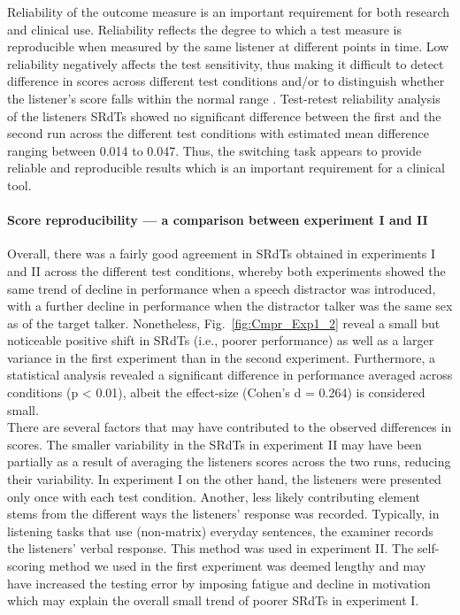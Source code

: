 \documentclass[a4paper, twoside]{templates/ociamthesis}
\begin{document}
\hfill\break
Reliability of the outcome measure is an important requirement for both research and clinical use. Reliability reflects the degree to which a test measure is reproducible when measured by the same listener at different points in time. Low reliability negatively affects the test sensitivity, thus making it difficult to detect difference in scores across different test conditions and/or to distinguish whether the listener's score falls within the normal range \autocite{Cameron2007}.
Test-retest reliability analysis of the listeners SRdTs showed no significant difference between the first and the second run across the different test conditions with estimated mean difference ranging between 0.014 to 0.047. Thus, the switching task appears to provide reliable and reproducible results which is an important requirement for a clinical tool.\\

\hypertarget{score-reproducibility-a-comparison-between-experiment-i-and-ii-1}{%
\paragraph{Score reproducibility --- a comparison between experiment I and II}\label{score-reproducibility-a-comparison-between-experiment-i-and-ii-1}}

\hfill\break
Overall, there was a fairly good agreement in SRdTs obtained in experiments I and II across the different test conditions, whereby both experiments showed the same trend of decline in performance when a speech distractor was introduced, with a further decline in performance when the distractor talker was the same sex as of the target talker. Nonetheless, Fig.~\ref{fig:Cmpr_Exp1_2} reveal a small but noticeable positive shift in SRdTs (i.e., poorer performance) as well as a larger variance in the first experiment than in the second experiment. Furthermore, a statistical analysis revealed a significant difference in performance averaged across conditions (p \textless{} 0.01), albeit the effect-size (Cohen's d = 0.264) is considered small.\\

There are several factors that may have contributed to the observed differences in scores. The smaller variability in the SRdTs in experiment II may have been partially as a result of averaging the listeners scores across the two runs, reducing their variability. In experiment I on the other hand, the listeners were presented only once with each test condition. Another, less likely contributing element stems from the different ways the listeners' response was recorded. Typically, in listening tasks that use (non-matrix) everyday sentences, the examiner records the listeners' verbal response. This method was used in experiment II. The self-scoring method we used in the first experiment was deemed lengthy and may have increased the testing error by imposing fatigue and decline in motivation which may explain the overall small trend of poorer SRdTs in experiment I.\\
\end{document}
